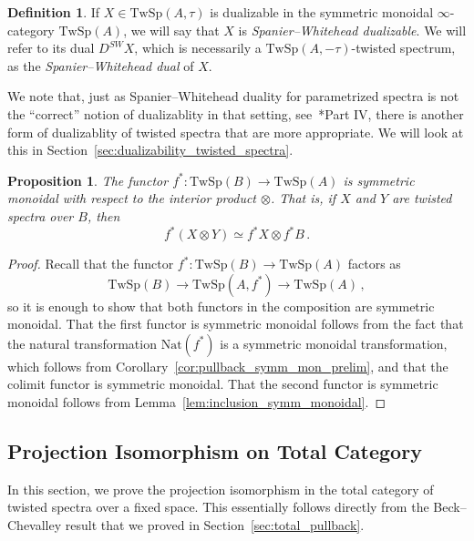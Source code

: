 \documentclass[10pt]{amsart}
\newcommand{\longto}{\longrightarrow}
\theoremstyle{plain}
\newtheorem{proposition}[theorem]{Proposition}
\theoremstyle{definition}
\newtheorem{definition}[theorem]{Definition}
\newcommand{\TwSp}{\mathrm{TwSp}}
\begin{document}
\begin{definition}
  If $X \in \TwSp(A,\tau)$ is dualizable in the symmetric monoidal $\infty$-category $\TwSp(A)$, we will say that $X$ is \emph{Spanier--Whitehead dualizable}. We will refer to its dual $D^{SW} X$, which is necessarily a $\TwSp(A,-\tau)$-twisted spectrum, as the \emph{Spanier--Whitehead dual} of $X$.
\end{definition}

We note that, just as Spanier--Whitehead duality for parametrized spectra is not the ``correct'' notion of dualizablity in that setting, see~\cite{MS06}*{Part IV}, there is another form of dualizablity of twisted spectra that are more appropriate.
We will look at this in Section~\ref{sec:dualizability_twisted_spectra}.

\begin{proposition} \label{prop:pullback_strong_monoidal}
  The functor $f^* : \TwSp(B) \to \TwSp(A)$ is symmetric monoidal with respect to the interior product $\otimes$. That is, if $X$ and $Y$ are twisted spectra over $B$, then
  \[
  f^*(X \otimes Y) \simeq f^* X \otimes f^* B \,.
  \]

  \end{proposition}

  \begin{proof}
    Recall that the functor $f^* : \TwSp(B) \to \TwSp(A)$ factors as
    \[
    \TwSp(B) \longto \TwSp(A,f^*) \longto \TwSp(A) \,,
    \]
    so it is enough to show that both functors in the composition are symmetric monoidal.
    That the first functor is symmetric monoidal follows from the fact that the natural transformation $\mathrm{Nat}(f^*)$ is a symmetric monoidal transformation, which follows from Corollary~\ref{cor:pullback_symm_mon_prelim}, and that the colimit functor is symmetric monoidal. That the second functor is symmetric monoidal follows from Lemma~\ref{lem:inclusion_symm_monoidal}.
    \end{proof}

    \subsection{Projection Isomorphism on Total Category}

    In this section, we prove the projection isomorphism in the total category of twisted spectra over a fixed space.
    This essentially follows directly from the Beck--Chevalley result that we proved in Section~\ref{sec:total_pullback}.
\end{document}
